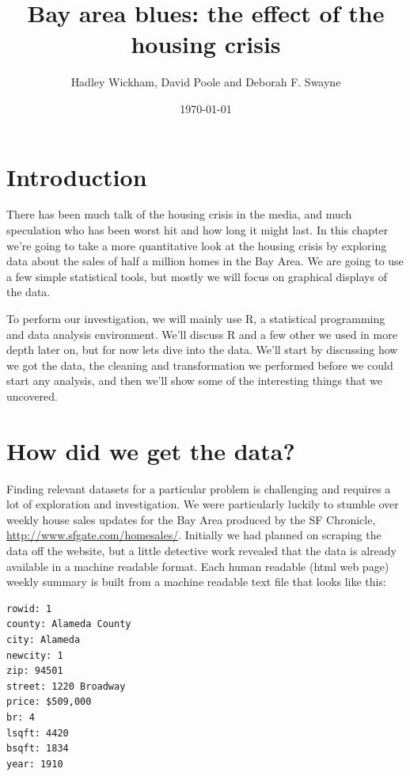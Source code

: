 \documentclass[oneside]{article}
\title{Bay area blues: the effect of the housing crisis}
\author{Hadley Wickham, David Poole and Deborah F. Swayne}
\date{\today}
\begin{document}
\maketitle 

\section{Introduction}

There has been much talk of the housing crisis in the media, and much speculation who has been worst hit and how long it might last.  In this chapter we're going to take a more quantitative look at the housing crisis by exploring data about the sales of half a million homes in the Bay Area.   We are going to use a few simple statistical tools, but mostly we will focus on graphical displays of the data.  


To perform our investigation, we will mainly use R, a statistical programming and data analysis environment.  We'll discuss R and a few other we used in more depth later on, but for now lets dive into the data.  We'll start by discussing how we got the data, the cleaning and transformation we performed before we could start any analysis, and then we'll show some of the interesting things that we uncovered.

\section{How did we get the data?}

Finding relevant datasets for a particular problem is challenging and requires a lot of exploration and investigation.  We were particularly luckily to stumble over weekly house sales updates for the Bay Area produced by the SF Chronicle, \url{http://www.sfgate.com/homesales/}.  Initially we had planned on scraping the data off the website, but a little detective work revealed that the data is already available in a machine readable format.  Each human readable (html web page) weekly summary is built from a machine readable text file that looks like this: 

\begin{verbatim}
rowid: 1
county: Alameda County
city: Alameda
newcity: 1
zip: 94501
street: 1220 Broadway
price: $509,000
br: 4
lsqft: 4420
bsqft: 1834
year: 1910
\end{verbatim}
\end{document}
